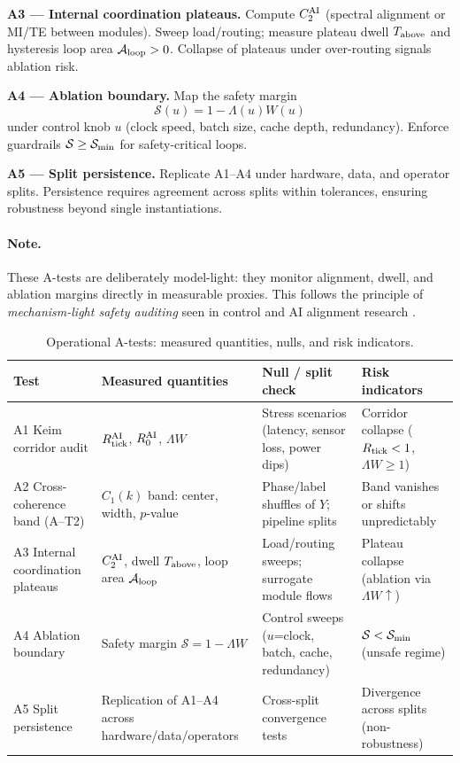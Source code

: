 \documentclass[12pt,a4paper,oneside]{scrreprt}
\begin{document}
\textbf{A3 — Internal coordination plateaus.} 
Compute $C_2^{\rm AI}$ (spectral alignment or MI/TE between modules). 
Sweep load/routing; measure plateau dwell $T_{\rm above}$ and hysteresis loop area $\mathcal A_{\rm loop}>0$. 
Collapse of plateaus under over-routing signals ablation risk.

\textbf{A4 — Ablation boundary.} 
Map the safety margin 
\[
\mathcal S(u)=1-\Lambda(u)W(u)
\] 
under control knob $u$ (clock speed, batch size, cache depth, redundancy). 
Enforce guardrails $\mathcal S\ge\mathcal S_{\rm min}$ for safety-critical loops.

\textbf{A5 — Split persistence.} 
Replicate A1–A4 under hardware, data, and operator splits. 
Persistence requires agreement across splits within tolerances, ensuring robustness beyond single instantiations.

\paragraph{Note.} 
These A-tests are deliberately model-light: they monitor alignment, dwell, and ablation margins directly in measurable proxies. 
This follows the principle of \emph{mechanism-light safety auditing} seen in control and AI alignment research \cite{amodei2016concrete,leike2018scalable,hendrycks2023overview}.

\begin{table}[h!]
\centering
\caption{Operational A-tests: measured quantities, nulls, and risk indicators.}
\label{tab:A-tests}
\begin{tabular}{|p{2.5cm}|p{5cm}|p{3.5cm}|p{3.5cm}|}
\hline
\textbf{Test} & \textbf{Measured quantities} & \textbf{Null / split check} & \textbf{Risk indicators} \\
\hline
A1 Keim corridor audit & $R_{\rm tick}^{\rm AI}$, $R_0^{\rm AI}$, $\Lambda W$ & Stress scenarios (latency, sensor loss, power dips) & Corridor collapse ($R_{\rm tick}<1$, $\Lambda W\geq 1$) \\
\hline
A2 Cross-coherence band (A–T2) & $C_1(k)$ band: center, width, $p$-value & Phase/label shuffles of $Y$; pipeline splits & Band vanishes or shifts unpredictably \\
\hline
A3 Internal coordination plateaus & $C_2^{\rm AI}$, dwell $T_{\rm above}$, loop area $\mathcal A_{\rm loop}$ & Load/routing sweeps; surrogate module flows & Plateau collapse (ablation via $\Lambda W\uparrow$) \\
\hline
A4 Ablation boundary & Safety margin $\mathcal S=1-\Lambda W$ & Control sweeps ($u$=clock, batch, cache, redundancy) & $\mathcal S<\mathcal S_{\rm min}$ (unsafe regime) \\
\hline
A5 Split persistence & Replication of A1–A4 across hardware/data/operators & Cross-split convergence tests & Divergence across splits (non-robustness) \\
\hline
\end{tabular}
\end{table}
\end{document}
